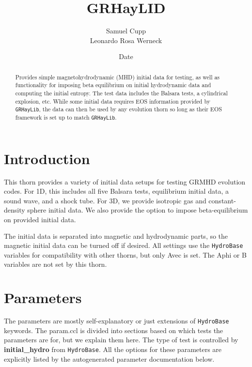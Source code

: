 \documentclass{article}
\newcommand{\glib}{\texttt{GRHayLib}\xspace}
\newcommand{\hbase}{\texttt{HydroBase}\xspace}
\begin{document}
\title{GRHayLID}
\author{Samuel Cupp \\ Leonardo Rosa Werneck}
\date{$ $Date$ $}

\maketitle


\begin{abstract}
Provides simple magnetohydrodynamic (MHD) initial data for testing,
as well as functionality for imposing beta equilibrium on initial
hydrodynamic data and computing the initial entropy. The test data
includes the Balsara tests, a cylindrical explosion, etc. While
some initial data requires EOS information provided by \glib,
the data can then be used by any evolution thorn so long as their EOS
framework is set up to match \glib.
\end{abstract}

\section{Introduction}

This thorn provides a variety of initial data setups for
testing GRMHD evolution codes. For 1D, this includes all five
Balsara tests, equilibrium initial data, a sound wave, and
a shock tube. For 3D, we provide isotropic gas and
constant-density sphere initial data. We also provide the option
to impose beta-equilibrium on provided initial data.

The initial data is separated into magnetic and hydrodynamic
parts, so the magnetic initial data can be turned off if desired.
All settings use the \hbase variables for compatibility with
other thorns, but only Avec is set. The Aphi or B variables are
not set by this thorn.

\section{Parameters}

The parameters are mostly self-explanatory or just extensions of
\hbase keywords. The param.ccl is divided into sections based
on which tests the parameters are for, but we explain them here.
The type of test is controlled by \textbf{initial\_hydro} from
\hbase. All the options for these parameters are explicitly
listed by the autogenerated parameter documentation below.
\end{document}
